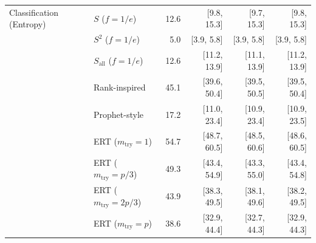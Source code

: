 \begin{table}[t]
\begin{tabular}{@{}llrrrr@{}}
\addlinespace
Classification (Entropy) & $S$ ($f=1/e$) & 12.6 & [9.8, 15.3] & [9.7, 15.3] & [9.8, 15.3] \\
 & $S^{2}$ ($f=1/e$) & 5.0 & [3.9, 5.8] & [3.9, 5.8] & [3.9, 5.8] \\
 & $S_{\mathrm{all}}$ ($f=1/e$) & 12.6 & [11.2, 13.9] & [11.1, 13.9] & [11.2, 13.9] \\
 & Rank-inspired & 45.1 & [39.6, 50.4] & [39.5, 50.5] & [39.5, 50.4] \\
 & Prophet-style & 17.2 & [11.0, 23.4] & [10.9, 23.4] & [10.9, 23.5] \\
 & ERT ($m_{\mathrm{try}}=1$) & 54.7 & [48.7, 60.5] & [48.5, 60.6] & [48.6, 60.5] \\
 & ERT ($m_{\mathrm{try}}=p/3$) & 49.3 & [43.4, 54.9] & [43.3, 55.0] & [43.4, 54.8] \\
 & ERT ($m_{\mathrm{try}}=2p/3$) & 43.9 & [38.3, 49.5] & [38.1, 49.6] & [38.2, 49.5] \\
 & ERT ($m_{\mathrm{try}}=p$) & 38.6 & [32.9, 44.4] & [32.7, 44.3] & [32.9, 44.3] \\
\bottomrule
\end{tabular}
\end{table}
